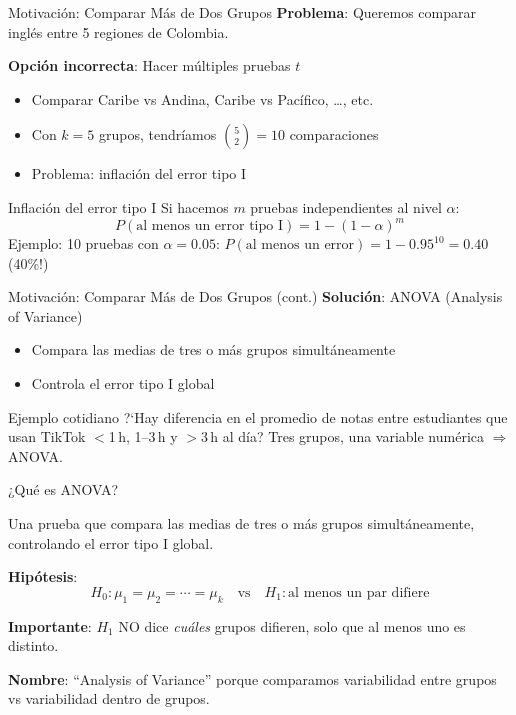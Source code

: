 \documentclass[aspectratio=169, 11pt]{beamer}
\begin{document}
\begin{frame}{Motivaci\'on: Comparar M\'as de Dos Grupos}
\textbf{Problema}: Queremos comparar ingl\'es entre 5 regiones de Colombia.

\vspace{0.3cm}
\textbf{Opci\'on incorrecta}: Hacer m\'ultiples pruebas $t$
\begin{itemize}
  \item Comparar Caribe vs Andina, Caribe vs Pac\'ifico, \ldots, etc.
  \item Con $k = 5$ grupos, tendr\'iamos $\binom{5}{2} = 10$ comparaciones
  \item Problema: \alert{inflaci\'on del error tipo I}
\end{itemize}

\vspace{0.3cm}
\begin{alertblock}{Inflaci\'on del error tipo I}
Si hacemos $m$ pruebas independientes al nivel $\alpha$:
\[
P(\text{al menos un error tipo I}) = 1 - (1-\alpha)^m
\]
Ejemplo: 10 pruebas con $\alpha = 0.05$:
$P(\text{al menos un error}) = 1 - 0.95^{10} = 0.40$ \quad (40\%!)
\end{alertblock}
\end{frame}

\begin{frame}{Motivaci\'on: Comparar M\'as de Dos Grupos (cont.)}
\textbf{Soluci\'on}: ANOVA (Analysis of Variance)
\begin{itemize}
  \item Compara las medias de \alert{tres o m\'as} grupos simult\'aneamente
  \item Controla el error tipo I global
\end{itemize}

\vspace{0.3cm}
\begin{exampleblock}{Ejemplo cotidiano}
?`Hay diferencia en el promedio de notas entre estudiantes que usan TikTok $<$1\,h, 1--3\,h y $>$3\,h al d\'ia? Tres grupos, una variable num\'erica $\Rightarrow$ ANOVA.
\end{exampleblock}
\end{frame}

\begin{frame}{¿Qué es ANOVA?}
\begin{definition}
Una prueba que compara las medias de \alert{tres o más} grupos simultáneamente, controlando el error tipo I global.
\end{definition}

\vspace{0.3cm}
\textbf{Hipótesis}:
\[
H_0: \mu_1 = \mu_2 = \cdots = \mu_k \quad \text{vs} \quad H_1: \text{al menos un par difiere}
\]

\vspace{0.3cm}
\textbf{Importante}: $H_1$ NO dice \emph{cuáles} grupos difieren, solo que \alert{al menos uno} es distinto.

\vspace{0.3cm}
\textbf{Nombre}: ``Analysis of Variance'' porque comparamos variabilidad \alert{entre} grupos vs variabilidad \alert{dentro} de grupos.
\end{frame}
\end{document}

